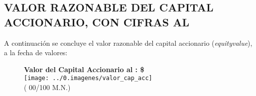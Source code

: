 
\subsection{VALOR RAZONABLE DEL CAPITAL ACCIONARIO, CON CIFRAS AL \fechaValoresCorto}

A continuaci\'on se concluye el valor razonable del capital accionario (\textit{\gls{equityvalue}}), a la fecha de valores:\\

\begin{figure}[H]
\centering
\textbf{\textcolor{principal}{Valor del Capital Accionario al \fechaValoresCorto:} \$\valorCapital{} \monedaCode}\\[10pt]
\texttt{[image: ../0.imagenes/valor\_cap\_acc]}\\[5pt]
(\textcolor{principal}{\valorCapitalLetra{} \moneda{} 00/100 M.N.})


\end{figure}
